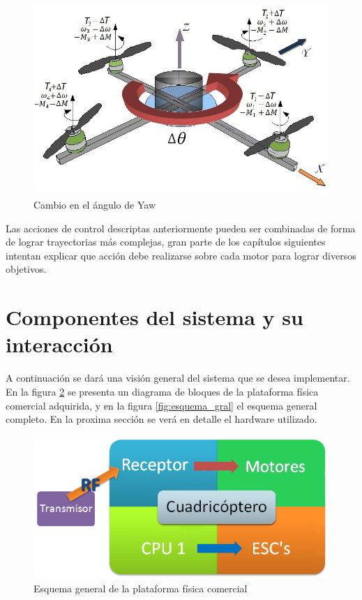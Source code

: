\documentclass[main]{subfiles}
\begin{document}
\begin{figure}[!h]
\centering
\includegraphics[scale=0.4]{./pics_general/quad_theta.jpg}
\caption{Cambio en el \'angulo de Yaw}
\label{fig:quad_theta}
\end{figure}
Las acciones de control descriptas anteriormente pueden ser combinadas de forma de lograr trayectorias m\'as complejas, gran parte de los cap\'itulos siguientes intentan explicar que acci\'on debe realizarse sobre cada motor para lograr diversos objetivos.

\section{Componentes del sistema y su interacci\'on}

A continuaci\'on se dar\'a una visi\'on general del sistema que se desea implementar. En la figura \ref{fig:esquema_gral_recortado} se presenta un diagrama de bloques de la plataforma física comercial adquirida, y en la figura \ref{fig:esquema_gral} el esquema general completo. En la proxima secci\'on se ver\'a en detalle el hardware utilizado.\\

\begin{figure}[h!]
  \centering
  \includegraphics[width=.6\textwidth]{./pics_general/diagrama_gral_recortado.png}
  \caption{Esquema general de la plataforma física comercial}
  \label{fig:esquema_gral_recortado}
\end{figure}
\end{document}
